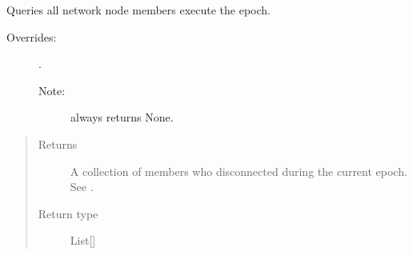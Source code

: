 \documentclass[letterpaper,10pt,english]{sphinxmanual}
\begin{document}
\begin{fulllineitems}
\begin{fulllineitems}
\begin{quote}
\begin{description}
\end{description}\end{quote}

\end{fulllineitems}


\begin{fulllineitems}
\label{\detokenize{app.domain:app.domain.cluster_groups.NewscastCluster.nodes_execute}}
Queries all network node members execute the epoch.
\begin{description}
\item[{Overrides:}] \leavevmode
{\hyperref[\detokenize{app.domain:app.domain.cluster_groups.Cluster.nodes_execute}]{}}.
\begin{description}
\item[{Note:}] \leavevmode
{}
always returns None.

\end{description}

\end{description}
\begin{quote}\begin{description}
\item[{Returns}] \leavevmode
A collection of members who disconnected during the current
epoch. See
{\hyperref[\detokenize{app.domain:app.domain.network_nodes.NewscastNode.update_status}]{}}.

\item[{Return type}] \leavevmode
List{[}{\hyperref[\detokenize{app:app.type_hints.NodeType}]{}}{]}

\end{description}\end{quote}

\end{fulllineitems}



\end{fulllineitems}
\end{document}
